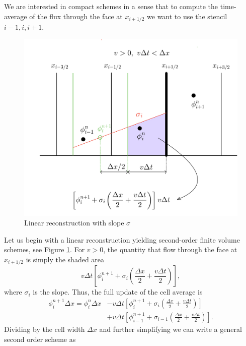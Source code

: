 \documentclass[../thesis.tex]{subfiles}
\begin{document}
We are interested in compact schemes in a sense that to compute the time-average of the flux through the face at \(x_{i+1/2}\) we want to use the stencil \(i-1, i, i+1\).
\begin{figure}[H]
	\centering
	\includegraphics[width=\textwidth]{2nd-order-crop.pdf}
	\caption{Linear reconstruction with slope \(\sigma\)}
	\label{fig:linear-rec-1d}
\end{figure}
Let us begin with a linear reconstruction yielding second-order finite volume schemes, see Figure \ref{fig:linear-rec-1d}.
For \(v>0\), the quantity that flow through the face at \(x_{i+1/2}\) is simply the shaded area
\[ v\Delta t\left[
    \phi_{i}^{n+1} + \sigma_{i}\left( \frac{\Delta x}{2} + \frac{v\Delta t}{2} \right)
\right], \]
where \(\sigma_{i}\) is the slope.
Thus, the full update of the cell average is
\begin{equation}
    \begin{split}
        \phi_{i}^{n+1}\Delta x
        =
        \phi_{i}^{n}\Delta x
        &-v\Delta t\left[
            \phi_{i}^{n+1} + \sigma_{i}\left( \frac{\Delta x}{2} + \frac{v\Delta t}{2} \right)
        \right]
        \\
        &+v\Delta t\left[
            \phi_{i-1}^{n+1} + \sigma_{i-1}\left( \frac{\Delta x}{2} + \frac{v\Delta t}{2} \right)
        \right].
    \end{split}
\end{equation}
Dividing by the cell width \(\Delta x\) and further simplifying we can write a general second order scheme as
\end{document}
